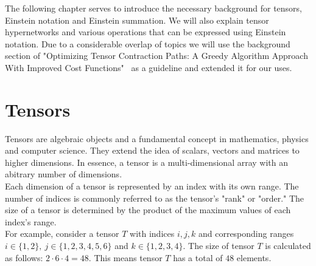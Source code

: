 The following chapter serves to introduce the necessary background for tensors, 
Einstein notation and Einstein summation. We will also explain tensor hypernetworks
and various operations that can be expressed using Einstein notation. Due to
a considerable overlap of topics we will use the background section of 
"Optimizing Tensor Contraction Paths: A Greedy Algorithm Approach With Improved Cost 
Functions"~\cite{cgreedy} as a guideline and extended it for our uses.

\section{Tensors}
Tensors are algebraic objects and a fundamental concept in mathematics, physics
and computer science. They extend the idea of scalars, vectors and matrices to
higher dimensions. In essence, a tensor is a multi-dimensional array with an abitrary
number of dimensions.\\
Each dimension of a tensor is represented by an index with its own range.
The number of indices is commonly referred to as the tensor's "rank" or "order."
The size of a tensor is determined by the product of the maximum values of each
index's range.\\
For example, consider a tensor $T$ with indices $i,j,k$ and corresponding ranges\\
$i \in \{1,2\},\ j \in \{1,2,3,4,5,6\}$ and $k \in \{1,2,3,4\}$. The size of
tensor $T$ is calculated as follows: $2 \cdot 6 \cdot 4 = 48$. This means tensor
$T$ has a total of $48$ elements.

